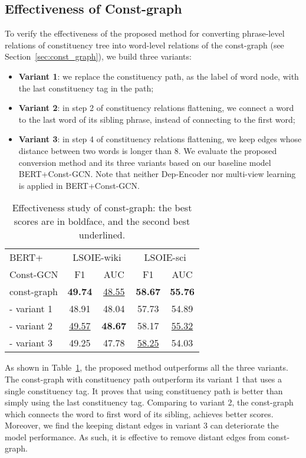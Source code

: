 \documentclass[11pt]{article}
\begin{document}
\subsection{Effectiveness of Const-graph}
\label{sec:constVariant}
To verify the effectiveness of the proposed method for converting phrase-level relations of constituency tree into word-level relations of the const-graph (see Section~\ref{sec:const_graph}), we build three variants:
\begin{itemize}
    \item \textbf{Variant 1}: we replace the constituency path, as the label of word node, with the last constituency tag in the path;
\item \textbf{Variant 2}: in step 2 of constituency relations flattening, we connect a word to the last word of its sibling phrase, instead of connecting to the first word;
\item \textbf{Variant 3}: in step 4 of constituency relations flattening, we keep edges whose distance between two words is longer than 8.
We evaluate the proposed conversion method and its three variants based on our baseline model BERT+Const-GCN. Note that neither Dep-Encoder nor multi-view learning is applied in BERT+Const-GCN.
\end{itemize}

\begin{table}[t]
\centering
    \begin{tabular}{l|cc|cc}
    \toprule
    BERT+ &
    \multicolumn{2}{c|}{LSOIE-wiki} &
    \multicolumn{2}{c}{LSOIE-sci}\\
    Const-GCN & F1 & AUC & F1 & AUC\\
    \midrule
    const-graph & \textbf{49.74} & \underline{48.55}         & \textbf{58.67} & \textbf{55.76}   \\
    - variant 1 & 48.91 & 48.04         & 57.73 & 54.89   \\
    - variant 2 & \underline{49.57} & \textbf{48.67}         & 58.17 & \underline{55.32}   \\
    - variant 3 & 49.25 & 47.78         & \underline{58.25} & 54.03   \\
    \bottomrule
    \end{tabular}
\caption{Effectiveness study of const-graph: the best scores are in boldface, and the second best underlined.}
\label{tab:const-graph-effect}
\end{table}

As shown in Table~\ref{tab:const-graph-effect}, the proposed method outperforms all the three variants. 
The const-graph with constituency path outperform its variant 1 that uses a single constituency tag. It proves that using constituency path is better than simply using the last constituency tag.
Comparing to variant 2, the const-graph which connects the word to first word of its sibling, achieves better scores.
Moreover, we find the keeping distant edges in variant 3 can deteriorate the model performance. As such, it is effective to remove distant edges from const-graph. 
\end{document}
